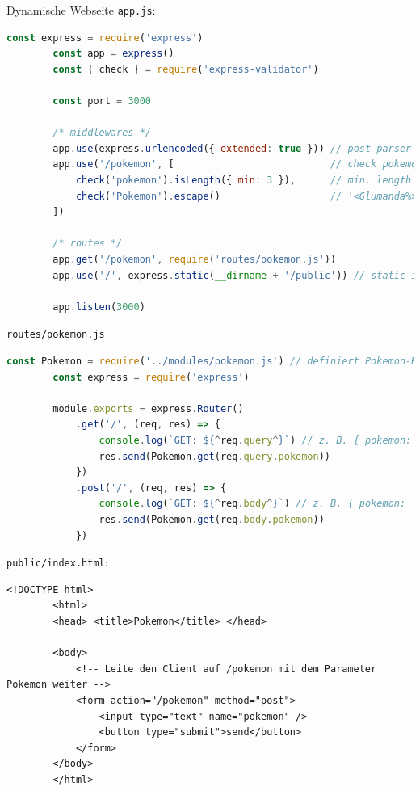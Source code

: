 \begin{example}{Dynamische Webseite}
    \texttt{app.js}:
    \begin{lstlisting}[language=JavaScript]
        const express = require('express')
        const app = express()
        const { check } = require('express-validator')

        const port = 3000

        /* middlewares */
        app.use(express.urlencoded({ extended: true })) // post parser
        app.use('/pokemon', [                           // check pokemon
            check('pokemon').isLength({ min: 3 }),      // min. length 3 chars (z. B. Mew)
            check('Pokemon').escape()                   // '<Glumanda%>' -> '&lt;Glumanda%&gt;'
        ])

        /* routes */
        app.get('/pokemon', require('routes/pokemon.js'))
        app.use('/', express.static(__dirname + '/public')) // static index.html, js/*, css/* etc.

        app.listen(3000)
    \end{lstlisting}

    \texttt{routes/pokemon.js}
    \begin{lstlisting}[language=JavaScript]
        const Pokemon = require('../modules/pokemon.js') // definiert Pokemon-Klasse
        const express = require('express')

        module.exports = express.Router()
            .get('/', (req, res) => {
                console.log(`GET: ${^req.query^}`) // z. B. { pokemon: 'Glumanda' } bei GET
                res.send(Pokemon.get(req.query.pokemon))
            })
            .post('/', (req, res) => {
                console.log(`GET: ${^req.body^}`) // z. B. { pokemon: 'Glumanda' } bei POST
                res.send(Pokemon.get(req.body.pokemon))
            })
    \end{lstlisting}

    \texttt{public/index.html}:
    \begin{lstlisting}[language=HTML5]
        <!DOCTYPE html>
        <html>
        <head> <title>Pokemon</title> </head>

        <body>
            <!-- Leite den Client auf /pokemon mit dem Parameter Pokemon weiter -->
            <form action="/pokemon" method="post">
                <input type="text" name="pokemon" />
                <button type="submit">send</button>
            </form>
        </body>
        </html>
    \end{lstlisting}
\end{example}

